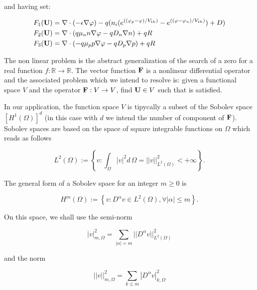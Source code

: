 and having set:

\begin{align*}
F_1(\mathbf{U}) & = \nabla \cdot (-\epsilon \nabla \varphi) - q(n_i(e^{((\varphi_p-\varphi)/V_{th})}-e^{((\varphi-\varphi_n)/V_{th})})+D) \\
F_2(\mathbf{U}) & = \nabla \cdot ( q\mu_n n \nabla \varphi - qD_n \nabla n )+qR \\
F_3(\mathbf{U}) & = \nabla \cdot (- q\mu_p p \nabla \varphi - qD_p \nabla p )+qR
\end{align*}

The non linear problem  is the abstract generalization of the search of a zero for a real function $f:\mathbb{R}\rightarrow\mathbb{R}$. The vector function $\mathbf{F}$ is a nonlinear differential operator and the associated problem which we intend to resolve is: given a functional space $V$ and the operator $\mathbf{F}:V\rightarrow V$, find $\mathbf{U}\in V$ such that  is satisfied.

In our application, the function space $V$ is tipycally a subset of the Sobolev space  $[H^1(\Omega)]^d$ (in this case with $d$ we intend the number of component of $\mathbf{F}$). Sobolev spaces are based on the space of square integrable functions on $\Omega$ which reads as follows

\begin{equation}
\label{space: L2}
L^2(\Omega) := \left\{ v : \int_{\Omega} |v|^2 d\,\Omega =||v||^2_{L^2(\Omega)}<+\infty \right\}.
\end{equation}

The general form of a Sobolev space for an integer $m\geq 0$ is

\begin{equation}
\label{space: Hm}
H^m(\Omega) := \left\{ v : D^{\alpha}v\in L^2(\Omega),\forall |\alpha|\leq m \right\}.
\end{equation}

On this space, we shall use the semi-norm

\begin{equation}
\label{eq: semiorm sobolev}
|v|_{m,\Omega}^2 = \sum_{|\alpha|=m} ||D^{\alpha}v||^2_{L^2(\Omega)}
\end{equation}

and the norm

\begin{equation}
\label{eq: norm sobolev}
||v||_{m,\Omega}^2 = \sum_{k\leq m} |D^{\alpha}v|^2_{k,\Omega}
\end{equation}

